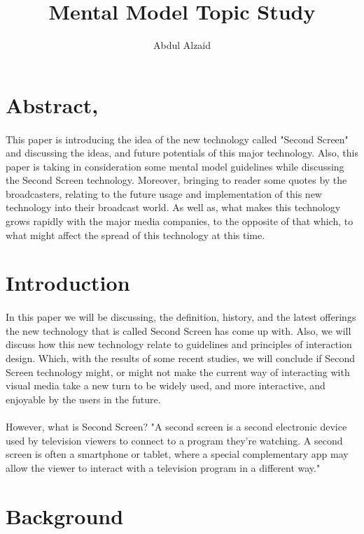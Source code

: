 \documentclass[12pt, oneside]{article}   	%
\title{Mental Model Topic Study}
\author{Abdul Alzaid}
\begin{document}
 \maketitle
  \section{Abstract,}
  \paragraph{}
This paper is introducing the idea of the new technology called "Second Screen" and discussing the ideas, and future potentials of this major technology.  Also, this paper is taking in consideration some mental model guidelines while discussing the Second Screen technology.  Moreover, bringing to reader some quotes by the broadcasters, relating to the future usage and implementation of this new technology into their broadcast world.  As well as, what makes this technology grows rapidly with the major media companies, to the opposite of that which, to what might affect the spread of this technology at this time.
 \section{Introduction}
\paragraph{}
In this paper we will be discussing, the definition, history, and the latest offerings the new technology that is called Second Screen has come up with. Also, we will discuss how this new technology relate to guidelines and principles of interaction design. Which, with the results of some recent studies, we will conclude if Second Screen technology might, or might not make the current way of interacting with visual media take a new turn to be widely used, and more interactive, and enjoyable by the users in the future. \paragraph{}
However, what is Second Screen?  "A second screen is a second electronic device used by television viewers to connect to a program they're watching. A second screen is often a smartphone or tablet, where a special complementary app may allow the viewer to interact with a television program in a different way."\cite{Second-Screen-Def}
 \section{Background}
\end{document}
